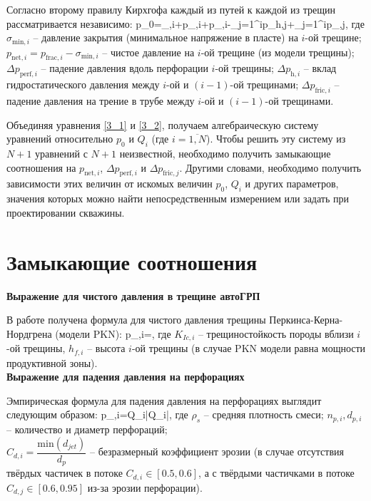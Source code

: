 Согласно второму правилу Кирхгофа каждый из путей к каждой из трещин рассматривается независимо:
\beq\label{3_2}
p_0=\sigma_{,i}+p_{,i}+\Delta p_{,i}-\sum_{j=1}^{i}{\Delta p_{h,j}}+\sum_{j=1}^{i}\Delta p_{,j},
\eeq
где $\sigma_{\text{min},i}$ -- давление закрытия (минимальное напряжение в пласте) на $i$-ой трещине;\newline
$p_{\text{net},i}=p_{\text{frac},i}-\sigma_{\text{min},i}$ -- чистое давление на $i$-ой трещине (из модели трещины);\newline
$\Delta p_{\text{perf},i}$ -- падение давления вдоль перфорации $i$-ой трещины;\newline
$\Delta p_{\text{h},i}$ -- вклад гидростатического давления между $i$-ой и $(i-1)$-ой трещинами;\newline
$\Delta p_{\text{fric},i}$ -- падение давления на трение в трубе между $i$-ой и $(i-1)$-ой трещинами.

Объединяя уравнения \eqref{3_1} и \eqref{3_2}, получаем алгебраическую систему уравнений относительно $p_0$ и $Q_i$ (где $i=\overline{1, N}$).
Чтобы решить эту систему из $N+1$ уравнений с $N+1$ неизвестной, необходимо получить замыкающие соотношения на $p_{\text{net},i}$, $\Delta p_{\text{perf},i}$ и $\Delta p_{\text{fric},j}$.
Другими словами, необходимо получить зависимости этих величин от искомых величин $p_0$, $Q_i$ и других параметров, значения которых можно найти непосредственным измерением или задать при проектировании скважины.

\section{Замыкающие соотношения}
\vspace*{-5mm}

\textbf{Выражение для чистого давления в трещине автоГРП}

В работе \cite{kabanova_shel} получена формула для чистого давления трещины Перкинса-Керна-Нордгрена (модели PKN):
\beq\label{1_3}
p_{,i}=,
\eeq
где $K_{Ic,i}$ -- трещиностойкость породы вблизи $i$-ой трещины,\newline
$h_{f,i}$ -- высота $i$-ой трещины (в случае PKN модели равна мощности продуктивной зоны).
\\

\textbf{Выражение для падения давления на перфорациях}

Эмпирическая формула для падения давления на перфорациях \cite{crump,cramer,gongbo} выглядит следующим образом:
\beq\label{1_4}
\Delta p_{,i}=Q_i\left|Q_i\right|,
\eeq
где $\rho_s$ -- средняя плотность смеси;\newline
$n_{p,i}, d_{p,i}$ -- количество и диаметр перфораций;\newline\\
$C_{d,i}=\dfrac{\text{min}(d_{jet})}{d_p}$ -- безразмерный коэффициент эрозии (в случае отсутствия твёрдых частичек в потоке $C_{d,i}\in\left[0.5,0.6\right]$, а с твёрдыми частичками в потоке $C_{d,j}\in\left[0.6,0.95\right]$  из-за эрозии перфорации).
\\

